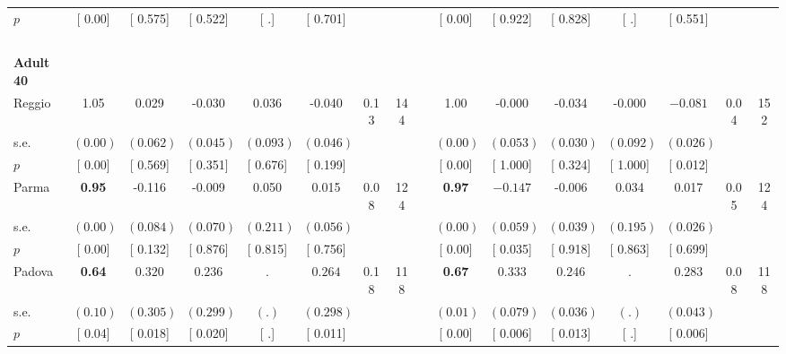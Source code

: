 \begin{longtable}{L{8em} c c c c c c c p{1em} c c c c c c c}
\quad \quad \quad \quad $ p$ & [     0.00] & [    0.575] & [    0.522] & [        .] & [    0.701] & & & & [     0.00] & [    0.922] & [    0.828] & [        .] & [    0.551] & &  \\[1em]
~\\[1em]
\quad \quad \textbf{Adult 40} & & & & & & & & & & & & & & & \\* 
\quad \quad \quad Reggio& 1.05 &     0.029 &    -0.030 &     0.036 &    -0.040 &      0.13 &       144 & & 1.00 &    -0.000 &    -0.034 &    -0.000 & $ \mathbf{   -0.081}$ &      0.04 &       152  \\*
\quad \quad \quad \quad s.e.& $ (     0.00)$ & $ (    0.062)$ & $ (    0.045)$ & $ (    0.093)$ & $ (    0.046)$ & & & & $ (     0.00)$ & $ (    0.053)$ & $ (    0.030)$ & $ (    0.092)$ & $ (    0.026)$ & &  \\*
\quad \quad \quad \quad $ p$ & [     0.00] & [    0.569] & [    0.351] & [    0.676] & [    0.199] & & & & [     0.00] & [    1.000] & [    0.324] & [    1.000] & [    0.012] & &  \\[1em]
\quad \quad \quad Parma& \textbf{     0.95} &    -0.116 &    -0.009 &     0.050 &     0.015 &      0.08 &       124 & & \textbf{     0.97} & $ \mathbf{   -0.147}$ &    -0.006 &     0.034 &     0.017 &      0.05 &       124  \\*
\quad \quad \quad \quad s.e.& $ (     0.00)$ & $ (    0.084)$ & $ (    0.070)$ & $ (    0.211)$ & $ (    0.056)$ & & & & $ (     0.00)$ & $ (    0.059)$ & $ (    0.039)$ & $ (    0.195)$ & $ (    0.026)$ & &  \\*
\quad \quad \quad \quad $ p$ & [     0.00] & [    0.132] & [    0.876] & [    0.815] & [    0.756] & & & & [     0.00] & [    0.035] & [    0.918] & [    0.863] & [    0.699] & &  \\[1em]
\quad \quad \quad Padova& \textbf{     0.64} & $ \mathbf{    0.320}$ & $ \mathbf{    0.236}$ &         . & $ \mathbf{    0.264}$ &      0.18 &       118 & & \textbf{     0.67} & $ \mathbf{    0.333}$ & $ \mathbf{    0.246}$ &         . & $ \mathbf{    0.283}$ &      0.08 &       118  \\*
\quad \quad \quad \quad s.e.& $ (     0.10)$ & $ (    0.305)$ & $ (    0.299)$ & $ (        .)$ & $ (    0.298)$ & & & & $ (     0.01)$ & $ (    0.079)$ & $ (    0.036)$ & $ (        .)$ & $ (    0.043)$ & &  \\*
\quad \quad \quad \quad $ p$ & [     0.04] & [    0.018] & [    0.020] & [        .] & [    0.011] & & & & [     0.00] & [    0.006] & [    0.013] & [        .] & [    0.006] & &  \\[1em]

\end{longtable}
